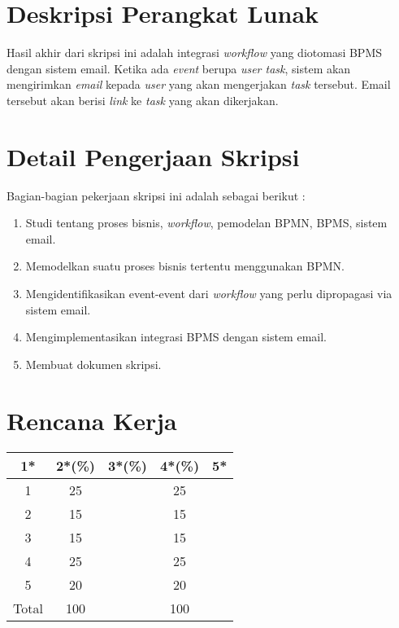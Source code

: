 \documentclass[a4paper,twoside]{article}
\begin{document}
\section{Deskripsi Perangkat Lunak}
Hasil akhir dari skripsi ini adalah integrasi \textit{workflow} yang diotomasi BPMS dengan sistem email. Ketika ada \textit{event} berupa \textit{user task}, sistem akan mengirimkan \textit{email} kepada \textit{user} yang akan mengerjakan \textit{task} tersebut. Email tersebut akan berisi \textit{link} ke \textit{task} yang akan dikerjakan. 

		

\section{Detail Pengerjaan Skripsi}
Bagian-bagian pekerjaan skripsi ini adalah sebagai berikut :
	\begin{enumerate}
		\item Studi tentang proses bisnis, \textit{workflow}, pemodelan BPMN, BPMS, sistem email.
		\item Memodelkan suatu proses bisnis tertentu menggunakan BPMN.
		\item Mengidentifikasikan event-event dari \textit{workflow} yang perlu dipropagasi via sistem email.
		\item Mengimplementasikan integrasi BPMS dengan sistem email.
		\item Membuat dokumen skripsi.
	\end{enumerate}

\section{Rencana Kerja}


\begin{center}
  \begin{tabular}{ | c | c | c | c | l |}
    \hline
    1*  & 2*(\%) & 3*(\%) & 4*(\%) &5*\\ \hline \hline
    1   & 25  &   & 25 &  \\ \hline
    2   & 15  &   & 15 &  \\ \hline
    3   & 15  &   & 15 &  \\ \hline
    4   & 25  &   & 25 &  \\ \hline
    5   & 20  &   & 20 &  \\ \hline
    Total  & 100  &   & 100 &  \\ \hline
                          \end{tabular}
\end{center}
\end{document}
